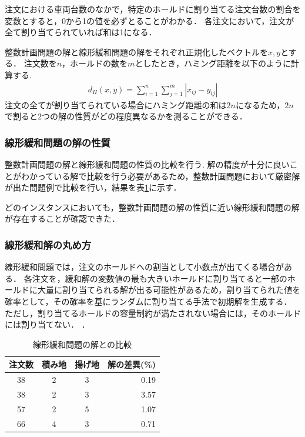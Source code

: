 注文における車両台数のなかで，特定のホールドに割り当てる注文台数の割合を変数とすると，0から1の値を必ずとることがわかる．
各注文において，注文が全て割り当てられていれば和は1になる．

整数計画問題の解と線形緩和問題の解をそれぞれ正規化したベクトルを$x,y$とする．
注文数を$n$，ホールドの数を$m$としたとき，ハミング距離を以下のように計算する.
\begin{align*}
 d_H(x,y) =\sum_{i=1}^n \sum_{j=1}^m|x_{ij}-y_{ij}|
\end{align*}
注文の全てが割り当てられている場合にハミング距離の和は$2n$になるため，$2n$で割ると2つの解の性質がどの程度異なるかを測ることができる．


\subsubsection{線形緩和問題の解の性質}
整数計画問題の解と線形緩和問題の性質の比較を行う.
解の精度が十分に良いことがわかっている解で比較を行う必要があるため，整数計画問題において厳密解が出た問題例で比較を行い，結果を表\ref{hamming}に示す．

どのインスタンスにおいても，整数計画問題の解の性質に近い線形緩和問題の解が存在することが確認できた．

\subsubsection{線形緩和解の丸め方}
線形緩和問題では，注文のホールドへの割当として小数点が出てくる場合がある．
各注文を，緩和解の変数値の最も大きいホールドに割り当てると一部のホールドに大量に割り当てられる解が出る可能性があるため，割り当てられた値を確率として，その確率を基にランダムに割り当てる手法で初期解を生成する．
ただし，割り当てるホールドの容量制約が満たされない場合には，そのホールドには割り当てない．
．
\begin{table}[]
  \centering
  \caption{線形緩和問題の解との比較}
  \label{hamming}
\begin{tabular}{cccr}
\hline
注文数 & 積み地 & 揚げ地 & \multicolumn{1}{c}{解の差異(\%)} \\ \hline
38 & 2   & 3   & 0.19                        \\
38 & 2   & 3   & 3.57                         \\
57 & 2   & 5   & 1.07                         \\
66 & 4   & 3   & 0.71                        \\ \hline
\end{tabular}
\end{table}

